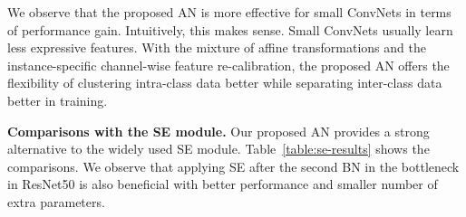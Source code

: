 \documentclass[runningheads]{llncs}
\begin{document}
We observe that the proposed AN is more effective for small ConvNets in terms of performance gain. Intuitively, this makes sense. Small ConvNets usually learn less expressive features. With the mixture of affine transformations and the instance-specific channel-wise feature re-calibration, the proposed AN offers the flexibility of clustering intra-class data better while separating inter-class data  better in training.

\textbf{Comparisons with the SE module.} Our proposed AN provides a strong alternative to the widely used SE module. Table~\ref{table:se-results} shows the comparisons. We observe that applying SE after the second BN in the bottleneck in ResNet50 is also beneficial with better performance and smaller number of extra parameters. 

\begin{table*} [t] 
    \centering
    \small{
    }
\end{table*}
\end{document}
